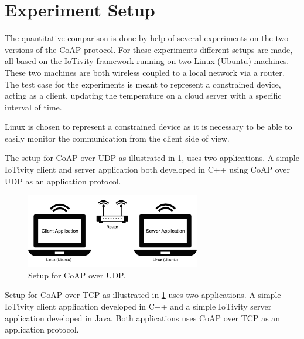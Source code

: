 \section{Experiment Setup}\label{sec:experimentsetup}
The quantitative comparison is done by help of several experiments on the two versions of the CoAP protocol. For these experiments different setups are made, all based on the IoTivity framework running on two Linux (Ubuntu) machines. These two machines are both wireless coupled to a local network via a router. The test case for the experiments is meant to represent a constrained device, acting as a client, updating the temperature on a cloud server with a specific interval of time. 

Linux is chosen to represent a constrained device as it is necessary to be able to easily monitor the communication from the client side of view.

The setup for CoAP over UDP as illustrated in \figurename \ref{fig:setup}, uses two applications. A simple IoTivity client and server application both developed in C++ using CoAP over UDP as an application protocol.
\begin{figure}[bht]
	\centering
	\includegraphics[width=3in]{gfx/setupa}
	\caption{Setup for CoAP over UDP.}
	\label{fig:setup}
\end{figure}

Setup for CoAP over TCP as illustrated in \figurename \ref{fig:setup} uses two applications. A simple IoTivity client application developed in C++ and a simple IoTivity server application developed in Java. Both applications uses CoAP over TCP as an application protocol.

